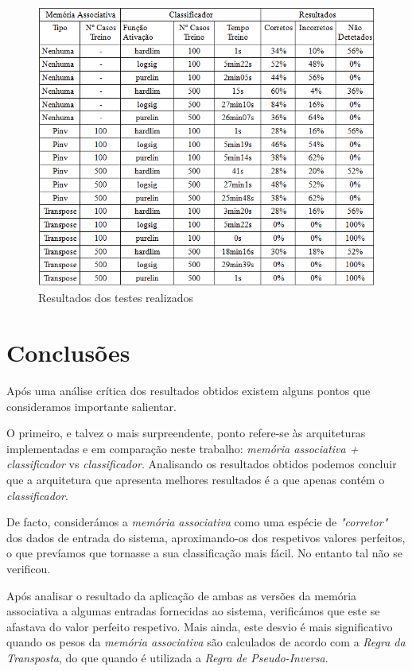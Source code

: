 \documentclass{article}
\begin{document}
\begin{figure}[h]
  \centering
      \includegraphics[scale=0.7]{Results.png}
  \caption{Resultados dos testes realizados}
\end{figure}


\pagebreak

\section{Conclusões}

Após uma análise crítica dos resultados obtidos existem alguns pontos que consideramos importante salientar.

O primeiro, e talvez o mais surpreendente, ponto refere-se às arquiteturas implementadas e em comparação neste trabalho: \emph{memória associativa + classificador} vs \emph{classificador}. Analisando os resultados obtidos podemos concluir que a arquitetura que apresenta melhores resultados é a que apenas contém o \emph{classificador}.

De facto, considerámos a \emph{memória associativa} como uma espécie de \emph{"corretor"} dos dados de entrada do sistema, aproximando-os dos respetivos valores perfeitos, o que prevíamos que tornasse a sua classificação mais fácil. No entanto tal não se verificou.

Após analisar o resultado da aplicação de ambas as versões da memória associativa a algumas entradas fornecidas ao sistema, verificámos que este se afastava do valor perfeito respetivo. Mais ainda, este desvio é mais significativo quando os pesos da \emph{memória associativa} são calculados de acordo com a \emph{Regra da Transposta}, do que quando é utilizada a \emph{Regra de Pseudo-Inversa}.
\end{document}
